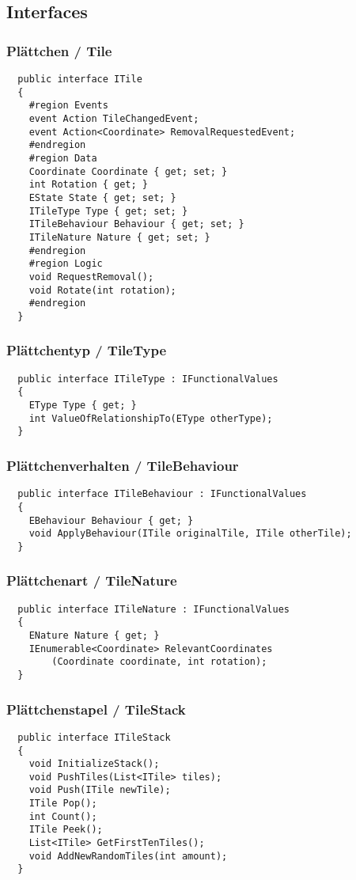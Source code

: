 \documentclass[../main.tex]{subfiles}
\begin{document}
	
	
	
	\subsection{Interfaces}
	\subsubsection{Plättchen / Tile}
	\begin{lstlisting}
  public interface ITile
  {
	#region Events
	event Action TileChangedEvent;
	event Action<Coordinate> RemovalRequestedEvent;
	#endregion
	#region Data
	Coordinate Coordinate { get; set; }
	int Rotation { get; }
	EState State { get; set; }
	ITileType Type { get; set; }
	ITileBehaviour Behaviour { get; set; }
	ITileNature Nature { get; set; }
	#endregion
	#region Logic
	void RequestRemoval();
	void Rotate(int rotation);
	#endregion
  }
	\end{lstlisting}

	\subsubsection{Plättchentyp / TileType}
	\begin{lstlisting}
  public interface ITileType : IFunctionalValues
  {
	EType Type { get; }
	int ValueOfRelationshipTo(EType otherType);
  }
	\end{lstlisting}

	\subsubsection{Plättchenverhalten / TileBehaviour}
	\begin{lstlisting}
  public interface ITileBehaviour : IFunctionalValues
  {
	EBehaviour Behaviour { get; }
	void ApplyBehaviour(ITile originalTile, ITile otherTile);
  }
	\end{lstlisting}

	\subsubsection{Plättchenart / TileNature}
	\begin{lstlisting}
  public interface ITileNature : IFunctionalValues
  {
	ENature Nature { get; }
	IEnumerable<Coordinate> RelevantCoordinates
		(Coordinate coordinate, int rotation);
  }
	\end{lstlisting}

	\subsubsection{Plättchenstapel / TileStack}
	\begin{lstlisting}
  public interface ITileStack
  {
	void InitializeStack();
	void PushTiles(List<ITile> tiles);
	void Push(ITile newTile);
	ITile Pop();
	int Count();
	ITile Peek();
	List<ITile> GetFirstTenTiles();
	void AddNewRandomTiles(int amount);
  }
	\end{lstlisting}
\end{document}
